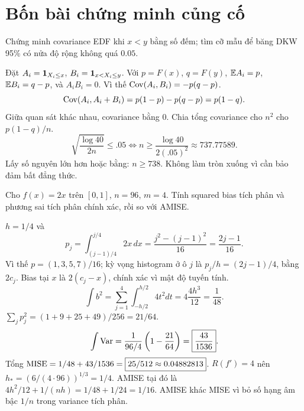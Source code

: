 \section{Bốn bài chứng minh củng cố}
\begin{exercise}
Chứng minh covariance EDF khi $x<y$ bằng số đếm; tìm cỡ mẫu để băng
DKW 95\% có nửa độ rộng không quá $0.05$.
\end{exercise}
\begin{solution}
Đặt $A_i=\mathbf 1_{X_i\leq x}$, $B_i=\mathbf 1_{x<X_i\leq y}$.
Với $p=F(x)$, $q=F(y)$, $\mathbb E A_i=p$, $\mathbb E B_i=q-p$,
và $A_iB_i=0$. Vì thế
$\operatorname{Cov}(A_i,B_i)=-p(q-p)$.
\[
\operatorname{Cov}(A_i,A_i+B_i)=p(1-p)-p(q-p)=p(1-q).
\]
Giữa quan sát khác nhau, covariance bằng 0. Chia tổng covariance cho
$n^2$ cho $\boxed{p(1-q)/n}$.
\[
\sqrt{\frac{\log40}{2n}}\leq.05
\iff n\geq\frac{\log40}{2(.05)^2}\approx737.77589.
\]
Lấy số nguyên lớn hơn hoặc bằng: $\boxed{n\geq738}$.
Không làm tròn xuống vì cần bảo đảm bất đẳng thức.
\end{solution}

\begin{exercise}
Cho $f(x)=2x$ trên $[0,1]$, $n=96$, $m=4$.
Tính squared bias tích phân và phương sai tích phân chính xác, rồi
so với AMISE.
\end{exercise}
\begin{solution}
$h=1/4$ và
\[
p_j=\int_{(j-1)/4}^{j/4}2x\,dx
=\frac{j^2-(j-1)^2}{16}=\frac{2j-1}{16}.
\]
Vì thế $p=(1,3,5,7)/16$; kỳ vọng histogram ở ô $j$ là $p_j/h=(2j-1)/4$,
bằng $2c_j$. Bias tại $x$ là $2(c_j-x)$, chính xác vì mật độ tuyến tính.
\[
\int b^2=\sum_{j=1}^4\int_{-h/2}^{h/2}4t^2dt
=4\frac{4h^3}{12}=\boxed{\frac1{48}}.
\]
$\sum_jp_j^2=(1+9+25+49)/256=21/64$.
\[
\int\operatorname{Var}=\frac1{96/4}\left(1-\frac{21}{64}\right)
=\boxed{\frac{43}{1536}}.
\]
Tổng $\operatorname{MISE}=1/48+43/1536=\boxed{25/512\approx0.04882813}$.
$R(f')=4$ nên $h_*=(6/(4\cdot96))^{1/3}=1/4$.
AMISE tại đó là $4h^2/12+1/(nh)=1/48+1/24=\boxed{1/16}$.
AMISE khác MISE vì bỏ số hạng âm bậc $1/n$ trong variance tích phân.
\end{solution}


